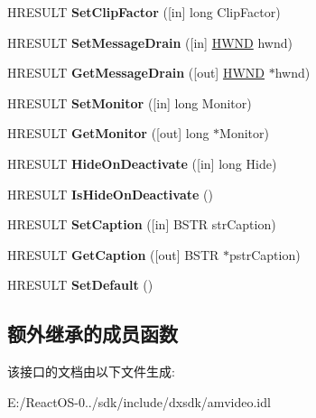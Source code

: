 \begin{DoxyCompactItemize}
H\+R\+E\+S\+U\+LT {\bfseries Set\+Clip\+Factor} (\mbox{[}in\mbox{]} long Clip\+Factor)
\item 
\mbox{\label{interface_i_full_screen_video_a1fb848975d2087649a9b3be6800b73a8}} 
H\+R\+E\+S\+U\+LT {\bfseries Set\+Message\+Drain} (\mbox{[}in\mbox{]} \hyperlink{interfacevoid}{H\+W\+ND} hwnd)
\item 
\mbox{\label{interface_i_full_screen_video_ab8e075417ca81369b4a58f9825c10fd6}} 
H\+R\+E\+S\+U\+LT {\bfseries Get\+Message\+Drain} (\mbox{[}out\mbox{]} \hyperlink{interfacevoid}{H\+W\+ND} $\ast$hwnd)
\item 
\mbox{\label{interface_i_full_screen_video_adfde1fda5ba513c793822b250c404162}} 
H\+R\+E\+S\+U\+LT {\bfseries Set\+Monitor} (\mbox{[}in\mbox{]} long Monitor)
\item 
\mbox{\label{interface_i_full_screen_video_aa016628f94487e3cb96a73e54229a4f8}} 
H\+R\+E\+S\+U\+LT {\bfseries Get\+Monitor} (\mbox{[}out\mbox{]} long $\ast$Monitor)
\item 
\mbox{\label{interface_i_full_screen_video_afcd570cdf1ab7aabe260653556a05001}} 
H\+R\+E\+S\+U\+LT {\bfseries Hide\+On\+Deactivate} (\mbox{[}in\mbox{]} long Hide)
\item 
\mbox{\label{interface_i_full_screen_video_abde5f2d25c64cb902349c2b138616a6a}} 
H\+R\+E\+S\+U\+LT {\bfseries Is\+Hide\+On\+Deactivate} ()
\item 
\mbox{\label{interface_i_full_screen_video_a05aa760cb21670606cf25501682e0fb6}} 
H\+R\+E\+S\+U\+LT {\bfseries Set\+Caption} (\mbox{[}in\mbox{]} B\+S\+TR str\+Caption)
\item 
\mbox{\label{interface_i_full_screen_video_a0bb1c7b506c3bd7ba7184d5253897d2d}} 
H\+R\+E\+S\+U\+LT {\bfseries Get\+Caption} (\mbox{[}out\mbox{]} B\+S\+TR $\ast$pstr\+Caption)
\item 
\mbox{\label{interface_i_full_screen_video_a4546c72508ba6682ba5718ac2eba4f6e}} 
H\+R\+E\+S\+U\+LT {\bfseries Set\+Default} ()
\end{DoxyCompactItemize}
\subsection*{额外继承的成员函数}


该接口的文档由以下文件生成\+:\begin{DoxyCompactItemize}
\item 
E\+:/\+React\+O\+S-\/0../sdk/include/dxsdk/amvideo.\+idl\end{DoxyCompactItemize}
